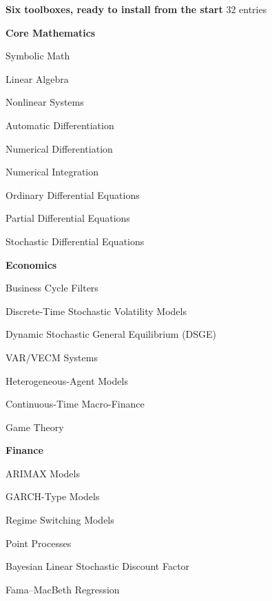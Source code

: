\documentclass[10pt,a4paper]{article}
\begin{document}
\vspace{4mm}
\newcommand{\tbcol}[2]{\begin{minipage}[t]{0.315\linewidth}\vspace{0pt}\raggedright
  {\color{amber}\bfseries #1}\par\nointerlineskip\vspace{3pt}
  \noindent{\color{amber!60}\rule{\linewidth}{0.5pt}}\par\vspace{3pt}
  {\color{white}\footnotesize\setlength{\parskip}{1.5pt}#2}\end{minipage}}
\begin{tcolorbox}[enhanced, colback=navy, colframe=amber, boxrule=0.8pt, arc=4pt,
  left=8pt, right=8pt, top=7pt, bottom=8pt]
{\color{amber}\large\bfseries\faToolbox\enspace Six toolboxes, ready to install from the start}\hfill
  {\color{amber!75}\small 32 entries}\par\vspace{6pt}
\tbcol{Core Mathematics}{Symbolic Math\par
Linear Algebra\par
Nonlinear Systems\par
Automatic Differentiation\par
Numerical Differentiation\par
Numerical Integration\par
Ordinary Differential Equations\par
Partial Differential Equations\par
Stochastic Differential Equations}\hfill
\tbcol{Economics}{Business Cycle Filters\par
Discrete-Time Stochastic Volatility Models\par
Dynamic Stochastic General Equilibrium (DSGE)\par
VAR/VECM Systems\par
Heterogeneous-Agent Models\par
Continuous-Time Macro-Finance\par
Game Theory}\hfill
\tbcol{Finance}{ARIMAX Models\par
GARCH-Type Models\par
Regime Switching Models\par
Point Processes\par
Bayesian Linear Stochastic Discount Factor\par
Fama--MacBeth Regression}\par\vspace{8pt}

\end{tcolorbox}
\end{document}
